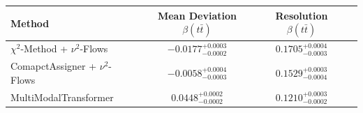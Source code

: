     \begin{tabular}{lccc}
        \toprule
        Method & Mean Deviation $\beta(t\bar{t})$ & Resolution $\beta(t\bar{t})$ \\
        \midrule
        $\chi^2$-Method + $\nu^2$-Flows & $-0.0177^{+0.0003}_{-0.0002}$ & $0.1705^{+0.0004}_{-0.0003}$ \\
        ComapctAssigner + $\nu^2$-Flows & $-0.0058^{+0.0004}_{-0.0003}$ & $0.1529^{+0.0003}_{-0.0004}$ \\
        MultiModalTransformer & $0.0448^{+0.0002}_{-0.0002}$ & $0.1210^{+0.0003}_{-0.0002}$ \\
        \bottomrule
    \end{tabular}